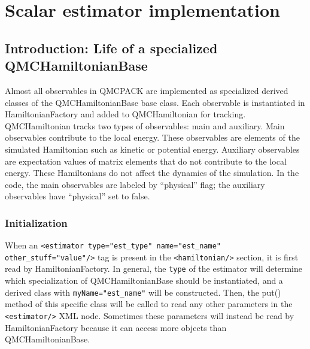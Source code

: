 \section{Scalar estimator implementation}
\subsection{Introduction: Life of a specialized QMCHamiltonianBase}

Almost all observables in QMCPACK are implemented as specialized derived classes of the QMCHamiltonianBase base class. Each observable is instantiated in HamiltonianFactory and added to QMCHamiltonian for tracking. QMCHamiltonian tracks two types of observables: main and auxiliary. Main observables contribute to the local energy. These observables are elements of the simulated Hamiltonian such as kinetic or potential energy. Auxiliary observables are expectation values of matrix elements that do not contribute to the local energy. These Hamiltonians do not affect the dynamics of the simulation. In the code, the main observables are labeled by ``physical'' flag; the auxiliary observables have ``physical'' set to false.

\subsubsection{Initialization}
When an \verb|<estimator type="est_type" name="est_name" other_stuff="value"/>| tag is present in the \verb|<hamiltonian/>| section, it is first read by HamiltonianFactory. In general, the \verb|type| of the estimator will determine which specialization of QMCHamiltonianBase should be instantiated, and a derived class with \verb|myName="est_name"| will be constructed. Then, the put() method of this specific class will be called to read any other parameters in the \verb|<estimator/>| XML node. Sometimes these parameters will instead be read by HamiltonianFactory because it can access more objects than QMCHamiltonianBase.

